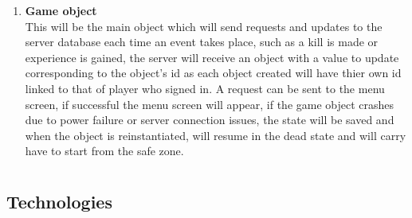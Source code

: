 \documentclass[letterpaper]{article}
\begin{document}
\begin{enumerate}
			\item \textbf{Game object}
			\\This will be the main object which will send requests and updates to the server database each time an event takes place, such as a kill is made or experience is gained, the server will receive an object with a value to update corresponding to the object's id as each object created will have thier own id linked to that of player who signed in. A request can be sent to the menu screen, if successful the menu screen will appear, if the game object crashes due to power failure or server connection issues, the state will be saved and when the object is reinstantiated, will resume in the dead state and will carry have to start from the safe zone.
			\end{enumerate}
		
		
		
		\vspace{0.2in}
		
		
		\section*{\colorbox{black}{}} 
		\vspace{0.1in}
		
			\subsection*{Technologies}
			\vspace{0.1in}
			
\end{document}
